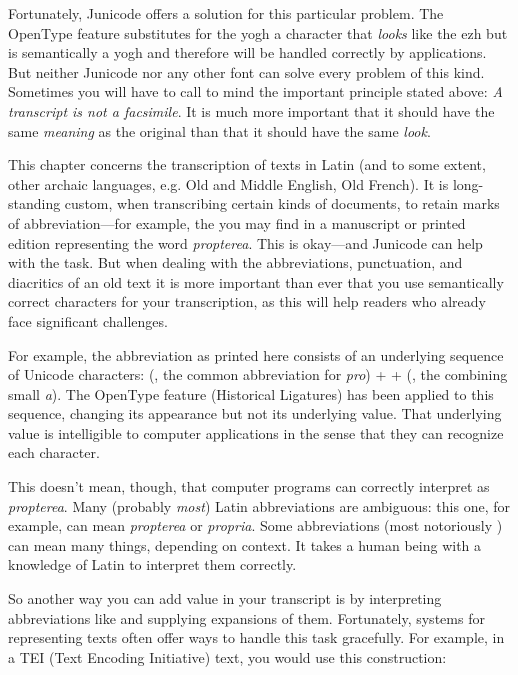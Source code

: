 Fortunately, Junicode offers a solution for this particular problem. The OpenType feature
 substitutes for
the yogh a character that \textit{looks} like the ezh but is semantically a yogh and therefore will be
handled correctly by applications. But neither Junicode nor any other font can solve every problem of this kind.
Sometimes you will have to call to mind the important principle stated above: \textit{A transcript is not a
facsimile}. It is much more important that it should have the same \textit{meaning} as the original than
that it should have the same \textit{look}.

This chapter concerns the transcription of texts in Latin (and to some extent, other archaic languages, e.g. Old and
Middle English, Old French). It is long-standing custom, when transcribing certain kinds of documents, to retain marks
of abbreviation---for example, the  you may find in a manuscript or printed edition representing
the word \textit{propterea}. This is okay---and Junicode can help with the task. But when dealing with the
abbreviations, punctuation, and diacritics of an old text it is more important than ever that you use semantically
correct characters for your transcription, as this will help readers who already face significant challenges.

For example, the abbreviation  as printed here consists of an underlying sequence of Unicode
characters:  (, the common abbreviation for \textit{pro}) +  + 
(, the combining small \textit{a}). The OpenType feature 
 (Historical Ligatures) has been
applied to this sequence, changing its appearance but not its underlying value. That underlying value is intelligible
to computer applications in the sense that they can recognize each character.

This doesn't mean, though, that computer programs can correctly interpret  as
\textit{propterea}. Many (probably \textit{most}) Latin abbreviations are ambiguous: this one,
for example, can mean \textit{propterea} or \textit{propria}. Some abbreviations (most
notoriously  ) can mean many things, depending on context. It takes a human being with a
knowledge of Latin to interpret them correctly.

So another way you can add value in your transcript is by interpreting abbreviations like
 and
supplying expansions of them. Fortunately, systems for representing texts often offer ways to handle this task
gracefully. For example, in a TEI (Text Encoding Initiative) text, you would use this construction:\\[1ex]


